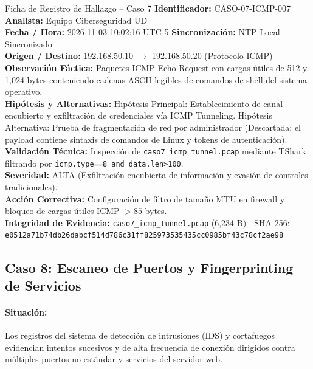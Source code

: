 \documentclass[11pt,letterpaper]{article}
\begin{document}
\begin{hallazgobox}{Ficha de Registro de Hallazgo -- Caso 7}
    \textbf{Identificador:} CASO-07-ICMP-007 \hfill \textbf{Analista:} Equipo Ciberseguridad UD\\
    \textbf{Fecha / Hora:} 2026-11-03 10:02:16 UTC-5 \hfill \textbf{Sincronización:} NTP Local Sincronizado\\
    \textbf{Origen / Destino:} 192.168.50.10 $\rightarrow$ 192.168.50.20 (Protocolo ICMP)\\
    \textbf{Observación Fáctica:} Paquetes ICMP Echo Request con cargas útiles de 512 y 1,024 bytes conteniendo cadenas ASCII legibles de comandos de shell del sistema operativo.\\
    \textbf{Hipótesis y Alternativas:} Hipótesis Principal: Establecimiento de canal encubierto y exfiltración de credenciales vía ICMP Tunneling. Hipótesis Alternativa: Prueba de fragmentación de red por administrador (Descartada: el payload contiene sintaxis de comandos de Linux y tokens de autenticación).\\
    \textbf{Validación Técnica:} Inspección de \texttt{caso7\_icmp\_tunnel.pcap} mediante TShark filtrando por \texttt{icmp.type==8 and data.len>100}.\\
    \textbf{Severidad:} ALTA (Exfiltración encubierta de información y evasión de controles tradicionales).\\
    \textbf{Acción Correctiva:} Configuración de filtro de tamaño MTU en firewall y bloqueo de cargas útiles ICMP $>85$ bytes.\\
    \textbf{Integridad de Evidencia:} \texttt{caso7\_icmp\_tunnel.pcap} (6,234 B) | SHA-256: \texttt{e0512a71b74db26dabcf514d786c31ff825973535435cc0985bf43c78cf2ae98}
\end{hallazgobox}

\newpage
\subsection{Caso 8: Escaneo de Puertos y Fingerprinting de Servicios}

\paragraph{Situación:} Los registros del sistema de detección de intrusiones (IDS) y cortafuegos evidencian intentos sucesivos y de alta frecuencia de conexión dirigidos contra múltiples puertos no estándar y servicios del servidor web.
\end{document}
